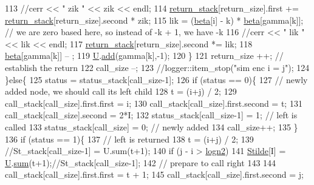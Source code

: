 \begin{DoxyCode}
113         \textcolor{comment}{//cerr << " zik " << zik << endl;}
114         \hyperlink{namespacehelper__vars_a6d2100c373830cacd232319a9958652d}{return\_stack}[return\_size].first += \hyperlink{namespacehelper__vars_a6d2100c373830cacd232319a9958652d}{return\_stack}[return\_size].second * zik;
115         lik = (\hyperlink{classgraph__encoder_a40880adecfd63fb86e94b4b0fc3f6bc2}{beta}[i] - k) * \hyperlink{classgraph__encoder_a40880adecfd63fb86e94b4b0fc3f6bc2}{beta}[gamma[k]]; \textcolor{comment}{// we are zero based here, so instead of -k + 1, we
       have -k}
116         \textcolor{comment}{//cerr << " lik " << lik << endl;}
117         \hyperlink{namespacehelper__vars_a6d2100c373830cacd232319a9958652d}{return\_stack}[return\_size].second *= lik;
118         \hyperlink{classgraph__encoder_a40880adecfd63fb86e94b4b0fc3f6bc2}{beta}[gamma[k]] -- ;
119         \hyperlink{classgraph__encoder_a3314c40920f2ee132958a6b0ce7e7995}{U}.\hyperlink{classreverse__fenwick__tree_a942d7f49b37e53ebfec3076d177691d7}{add}(gamma[k],-1);
120       \}
121       return\_size ++; \textcolor{comment}{// establish the return}
122       call\_size --;
123       \textcolor{comment}{//logger::item\_stop("sim enc i = j");}
124     \}\textcolor{keywordflow}{else}\{
125       status = status\_stack[call\_size-1];
126       \textcolor{keywordflow}{if} (status == 0)\{
127         \textcolor{comment}{// newly added node, we should call its left child}
128         t = (i+j) / 2;
129         call\_stack[call\_size].first.first = i;
130         call\_stack[call\_size].first.second = t;
131         call\_stack[call\_size].second = 2*I;
132         status\_stack[call\_size-1] = 1; \textcolor{comment}{// left is called}
133         status\_stack[call\_size] = 0; \textcolor{comment}{// newly added}
134         call\_size++;
135       \}
136       \textcolor{keywordflow}{if} (status == 1)\{
137         \textcolor{comment}{// left is returned}
138         t = (i+j) / 2;
139         \textcolor{comment}{//St\_stack[call\_size-1] = U.sum(t+1);}
140         \textcolor{keywordflow}{if} (j - i > \hyperlink{classgraph__encoder_a27fde3a95a280304877b1e37fc4d8553}{logn2})
141           \hyperlink{classgraph__encoder_a342688a3fdee511b7fae3f155cfb10cf}{Stilde}[I] = \hyperlink{classgraph__encoder_a3314c40920f2ee132958a6b0ce7e7995}{U}.\hyperlink{classreverse__fenwick__tree_a672731fd6395b4853430073a099a80e6}{sum}(t+1);\textcolor{comment}{//St\_stack[call\_size-1];}
142         \textcolor{comment}{// prepare to call right}
143         
144         call\_stack[call\_size].first.first = t + 1;
145         call\_stack[call\_size].first.second = j;

\end{DoxyCode}
